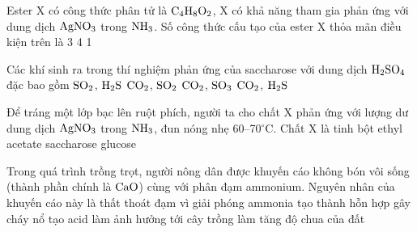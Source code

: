 \documentclass[11pt,a4paper]{article}
\begin{document}
\begin{ex}
Ester X có công thức phân tử là $\ce{C4H8O2}$, X có khả năng tham gia phản ứng với dung dịch $\ce{AgNO3}$ trong $\ce{NH3}$. Số công thức cấu tạo của ester X thỏa mãn điều kiện trên là
\choice
{3}
{4}
{}
{1}

\end{ex}
\begin{ex}
Các khí sinh ra trong thí nghiệm phản ứng của saccharose với dung dịch $\ce{H2SO4}$ đặc bao gồm
\choice
{$\ce{SO2}$, $\ce{H2S}$}
{\True $\ce{CO2}$, $\ce{SO2}$}
{$\ce{CO2}$, $\ce{SO3}$}
{$\ce{CO2}$, $\ce{H2S}$}

\end{ex}
\begin{ex}
Để tráng một lớp bạc lên ruột phích, người ta cho chất X phản ứng với lượng dư dung dịch $\ce{AgNO3}$ trong $\ce{NH3}$, đun nóng nhẹ 60--70$^\circ\text{C}$. Chất X là
\choice
{tinh bột}
{ethyl acetate}
{saccharose}
{\True glucose}

\end{ex}
\begin{ex}
Trong quá trình trồng trọt, người nông dân được khuyến cáo không bón vôi sống (thành phần chính là $\ce{CaO}$) cùng với phân đạm ammonium. Nguyên nhân của khuyến cáo này là
\choice
{\True thất thoát đạm vì giải phóng ammonia}
{tạo thành hỗn hợp gây cháy nổ}
{tạo acid làm ảnh hưởng tới cây trồng}
{làm tăng độ chua của đất}

\end{ex}
\end{document}
